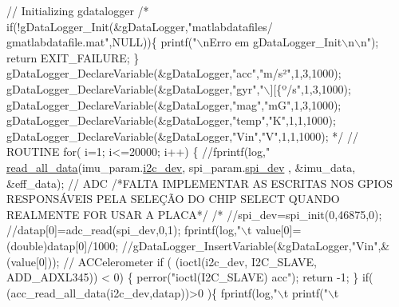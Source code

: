 \begin{DoxyCode}
\textcolor{comment}{// Initializing gdatalogger}
 \textcolor{comment}{/* if(!gDataLogger\_Init(&gDataLogger,"matlabdatafiles/
      gmatlabdatafile.mat",NULL))\{}
\textcolor{comment}{                printf("\(\backslash\)nErro em gDataLogger\_Init\(\backslash\)n\(\backslash\)n");}
\textcolor{comment}{                return EXIT\_FAILURE;}
\textcolor{comment}{        \}}
\textcolor{comment}{}
\textcolor{comment}{        gDataLogger\_DeclareVariable(&gDataLogger,"acc","m/s²",1,3,1000);}
\textcolor{comment}{        gDataLogger\_DeclareVariable(&gDataLogger,"gyr","\(\backslash\)][\{º/s",1,3,1000);}
\textcolor{comment}{        gDataLogger\_DeclareVariable(&gDataLogger,"mag","mG",1,3,1000);}
\textcolor{comment}{        gDataLogger\_DeclareVariable(&gDataLogger,"temp","K",1,1,1000);}
\textcolor{comment}{        gDataLogger\_DeclareVariable(&gDataLogger,"Vin","V",1,1,1000);}
\textcolor{comment}{  */}
\textcolor{comment}{// ROUTINE }
  \textcolor{keywordflow}{for}( i=1; i<=20000; i++)
  \{  
      \textcolor{comment}{//fprintf(log,"    %
      \hyperlink{communication_01_07C_xC3_xB3pia_01em_01conflito_01de_01Andr_xC3_xA9_01Carvalho_012013-04-26_08_8c_a577b5eb591b20e011d86397f2c6f3a53}{read\_all\_data}(imu\_param.\hyperlink{structIMU__PARAM__STRUCT_a8a870f383fc9ba0b682fdc9b8c0d2734}{i2c\_dev}, spi\_param.\hyperlink{structSPI__PARAM__STRUCT_abe385c44333d268d17cf648c8e371cad}{spi\_dev}
      , &imu\_data, &eff\_data);
  \textcolor{comment}{// ADC}
\textcolor{comment}{/*FALTA IMPLEMENTAR AS ESCRITAS NOS GPIOS RESPONSÁVEIS PELA SELEÇÃO DO CHIP
       SELECT QUANDO REALMENTE FOR USAR A PLACA*/}
\textcolor{comment}{/*      //spi\_dev=spi\_init(0,46875,0);}
\textcolor{comment}{      //datap[0]=adc\_read(spi\_dev,0,1);}
\textcolor{comment}{      fprintf(log,"\(\backslash\)t%
\textcolor{comment}{      value[0]=(double)datap[0]/1000;}
\textcolor{comment}{      //gDataLogger\_InsertVariable(&gDataLogger,"Vin",&(value[0]));}
\textcolor{comment}{  // ACCelerometer}
\textcolor{comment}{      if ( (ioctl(i2c\_dev, I2C\_SLAVE, ADD\_ADXL345)) < 0) \{}
\textcolor{comment}{        perror("ioctl(I2C\_SLAVE) acc");}
\textcolor{comment}{        return -1;}
\textcolor{comment}{      \}  }
\textcolor{comment}{      if( (acc\_read\_all\_data(i2c\_dev,datap))>0 )\{}
\textcolor{comment}{        fprintf(log,"\(\backslash\)t%
       printf("\(\backslash\)t%
}}}
\end{DoxyCode}
